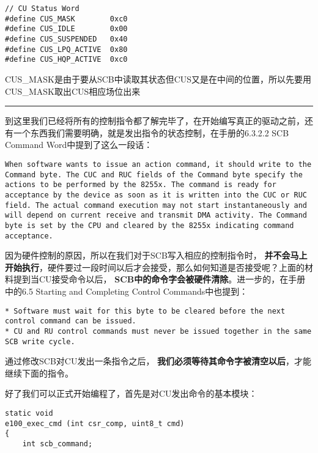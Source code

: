 \documentclass{article}
\newcommand{\highlight}[1]{{\bfseries \color{red}  #1}}
\begin{document}
\begin{CJK*}{UTF8}{gkai}
\begin{description}
\begin{lstlisting}[style=ccode, title={\scriptsize \ttfamily \bfseries kern/e100.h}]
// CU Status Word
#define CUS_MASK        0xc0
#define CUS_IDLE        0x00
#define CUS_SUSPENDED   0x40
#define CUS_LPQ_ACTIVE  0x80
#define CUS_HQP_ACTIVE  0xc0
\end{lstlisting}

CUS\_MASK是由于要从SCB中读取其状态但CUS又是在中间的位置，所以先要用CUS\_MASK取出CUS相应场位出来

\end{description}


\vspace{2em}
\hrule
\vspace{2em}

到这里我们已经将所有的控制指令都了解完毕了，在开始编写真正的驱动之前，还有一个东西我们需要明确，就是发出指令的状态控制，在手册的6.3.2.2 SCB Command Word中提到了这么一段话：

\begin{lstlisting}[style=challenge]
When software wants to issue an action command, it should write to the Command byte. The CUC and RUC fields of the Command byte specify the actions to be performed by the 8255x. The command is ready for acceptance by the device as soon as it is written into the CUC or RUC field. The actual command execution may not start instantaneously and will depend on current receive and transmit DMA activity. The Command byte is set by the CPU and cleared by the 8255x indicating command acceptance.
\end{lstlisting}

因为硬件控制的原因，所以在我们对于SCB写入相应的控制指令时，\highlight{并不会马上开始执行}，硬件要过一段时间以后才会接受，那么如何知道是否接受呢？上面的材料提到当CU接受命令以后，\highlight{SCB中的命令字会被硬件清除}。进一步的，在手册中的6.5 Starting and Completing Control Commands中也提到：

\begin{lstlisting}[style=challenge]
* Software must wait for this byte to be cleared before the next control command can be issued.
* CU and RU control commands must never be issued together in the same SCB write cycle.
\end{lstlisting}

通过修改SCB对CU发出一条指令之后，\highlight{我们必须等待其命令字被清空以后}，才能继续下面的指令。

\newpage
好了我们可以正式开始编程了，首先是对CU发出命令的基本模块：

\begin{lstlisting}[style=ccode, title={\scriptsize \ttfamily \bfseries kern/e100.c: e100\_exec\_cmd()}]
static void
e100_exec_cmd (int csr_comp, uint8_t cmd)
{
    int scb_command;


\end{lstlisting}
\end{CJK*}
\end{document}
